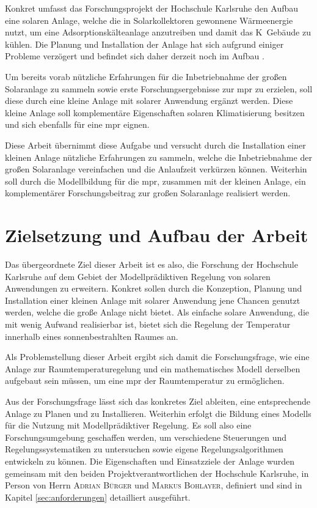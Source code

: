 Konkret umfasst das Forschungsprojekt der Hochschule Karlsruhe den Aufbau eine solaren Anlage, welche die in Solarkollektoren gewonnene Wärmeenergie nutzt, um eine Adsorptionskälteanlage anzutreiben und damit das K~Gebäude zu kühlen. Die Planung und Installation der Anlage hat sich aufgrund einiger Probleme verzögert und befindet sich daher derzeit noch im Aufbau \cite{hska}.

Um bereits vorab nützliche Erfahrungen für die Inbetriebnahme der großen Solaranlage zu sammeln sowie erste Forschungsergebnisse zur \acrlong{mpr} zu erzielen, soll diese durch eine kleine Anlage mit solarer Anwendung ergänzt werden. Diese kleine Anlage soll komplementäre Eigenschaften solaren Klimatisierung besitzen und sich ebenfalls für eine \acrlong{mpr} eignen.

Diese Arbeit übernimmt diese Aufgabe und versucht durch die Installation einer kleinen Anlage nützliche Erfahrungen zu sammeln, welche die Inbetriebnahme der großen Solaranlage vereinfachen und die Anlaufzeit verkürzen können. Weiterhin soll durch die Modellbildung für die \acrlong{mpr}, zusammen mit der kleinen Anlage, ein komplementärer Forschungsbeitrag zur großen Solaranlage realisiert werden.

\section{Zielsetzung und Aufbau der Arbeit}
\label{sec:ziel}

Das übergeordnete Ziel dieser Arbeit ist es also, die Forschung der Hochschule Karlsruhe auf dem Gebiet der Modellprädiktiven Regelung von solaren Anwendungen zu erweitern.
Konkret sollen durch die Konzeption, Planung und Installation einer kleinen Anlage mit solarer Anwendung jene Chancen genutzt werden, welche die große Anlage nicht bietet.
Als einfache solare Anwendung, die mit wenig Aufwand realisierbar ist, bietet sich die Regelung der Temperatur innerhalb eines sonnenbestrahlten Raumes an.

Als Problemstellung dieser Arbeit ergibt sich damit die Forschungsfrage, wie eine Anlage zur Raumtemperaturegelung und ein mathematisches Modell derselben aufgebaut sein müssen, um eine \acrlong{mpr} der Raumtemperatur zu ermöglichen.

Aus der Forschungsfrage lässt sich das konkretes Ziel ableiten, eine entsprechende Anlage zu Planen und zu Installieren. Weiterhin erfolgt die Bildung eines Modells für die Nutzung mit Modellprädiktiver Regelung.
Es soll also eine Forschungsumgebung geschaffen werden, um verschiedene Steuerungen und Regelungssystematiken zu untersuchen sowie eigene Regelungsalgorithmen entwickeln zu können.
Die Eigenschaften und Einsatzziele der Anlage wurden gemeinsam mit den beiden Projektverantwortlichen der Hochschule Karlsruhe, in Person von Herrn \textsc{Adrian Bürger} und \textsc{Markus Bohlayer}, definiert und sind in Kapitel \ref{sec:anforderungen} detailliert ausgeführt.


